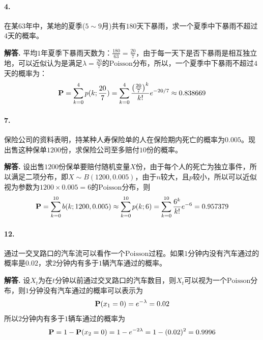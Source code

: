 \documentclass[12pt, a4paper, oneside]{ctexart}
\newenvironment{solution}{\par\noindent\textbf{解答. }}{\bigskip\par}
\begin{document}
\paragraph{4.}在某$63$年中，某地的夏季($5\sim 9$月)共有$180$天下暴雨，求一个夏季中下暴雨不超过$4$天的概率。
\begin{solution}
    平均$1$年夏季下暴雨天数为：$\frac{180}{63}=\frac{20}{7}$，由于每一天下是否下暴雨是相互独立地，可以近似认为是满足$\lambda = \frac{20}{7}$的$\text{Poisson}$分布，所以，一个夏季中下暴雨不超过$4$天的概率为：
    \begin{equation*}
        \P = \sum_{k=0}^4p(k;\frac{20}{7}) = \sum_{k=0}^4\frac{\left(\frac{20}{7}\right)^k}{k!}e^{-20/7} \approx 0.838669
    \end{equation*}
\end{solution}
\paragraph{7.}保险公司的资料表明，持某种人寿保险单的人在保险期内死亡的概率为$0.005$。现出售这种保单$1200$份，求保险公司至多赔付$10$份的概率。
\begin{solution}
    设出售$1200$份保单要赔付随机变量$X$份，由于每个人的死亡为独立事件，所以满足二项分布，即$X\sim B(1200, 0.005)$，由于$n$较大，且$p$较小，所以可以近似视为参数为$1200\times 0.005 = 6$的$\text{Poisson}$分布，则
    \begin{equation*}
        \P = \sum_{k=0}^{10}b(k;1200,0.005)\approx\sum_{k=0}^{10}p(k;6) = \sum_{k=0}^{10}\frac{6^k}{k!}e^{-6} = 0.957379
    \end{equation*}
\end{solution}
\paragraph{12.}通过一交叉路口的汽车流可以看作一个$\text{Poisson}$过程。如果$1$分钟内没有汽车通过的概率是$0.02$，求$2$分钟内有多于$1$辆汽车通过的概率。
\begin{solution}
    设$X_t$为在$t$分钟以前通过交叉路口的汽车数目，则$X_t$可以视为一个$\text{Poisson}$分布，则$1$分钟没有汽车通过的概率可以表示为
    \begin{equation*}
        \P(x_1 = 0) = e^{-\lambda} = 0.02
    \end{equation*}
    所以$2$分钟内有多于$1$辆车通过的概率为
    \begin{equation*}
        \P = 1- \P(x_2 = 0) = 1-e^{-2\lambda} = 1-(0.02)^2 = 0.9996
    \end{equation*}
\end{solution}
\end{document}
